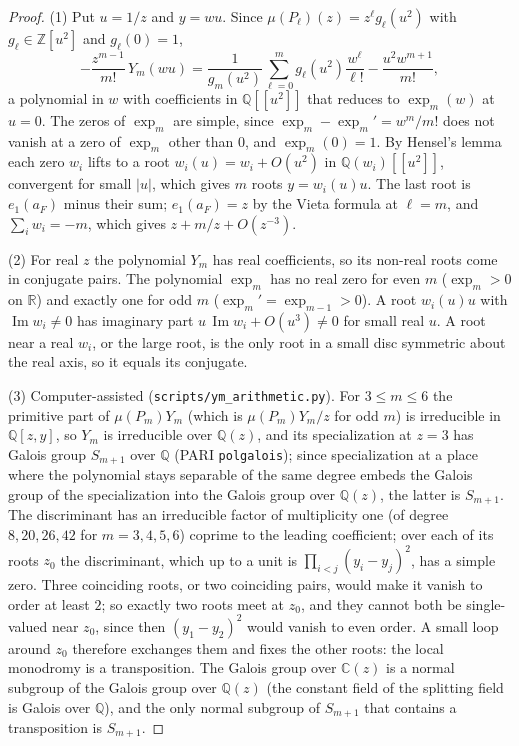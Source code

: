 \documentclass[11pt]{amsart}
\theoremstyle{plain}
\theoremstyle{definition}
\theoremstyle{remark}
\numberwithin{equation}{section}
\newcommand{\code}[1]{{\ttfamily\nolinkurl{#1}}}
\newcommand{\ZZ}{\mathbb{Z}}
\newcommand{\QQ}{\mathbb{Q}}
\newcommand{\RR}{\mathbb{R}}
\newcommand{\CC}{\mathbb{C}}
\newcommand{\Qz}{\QQ(z)}
\renewcommand{\Im}{\operatorname{Im}}
\begin{document}
\begin{proof}
(1) Put $u=1/z$ and $y=wu$. Since $\mu(P_\ell)(z)=z^{\ell}g_\ell(u^{2})$ with $g_\ell\in\ZZ[u^{2}]$ and $g_\ell(0)=1$,
\[
-\frac{z^{m-1}}{m!}\,Y_m(wu)=\frac{1}{g_m(u^{2})}\sum_{\ell=0}^{m}g_\ell(u^{2})\frac{w^{\ell}}{\ell!}-\frac{u^{2}w^{m+1}}{m!},
\]
a polynomial in $w$ with coefficients in $\QQ[[u^{2}]]$ that reduces to $\exp_m(w)$ at $u=0$. The zeros of $\exp_m$ are simple, since $\exp_m-\exp_m'=w^{m}/m!$ does not vanish at a zero of $\exp_m$ other than $0$, and $\exp_m(0)=1$. By Hensel's lemma each zero $w_i$ lifts to a root $w_i(u)=w_i+O(u^{2})$ in $\QQ(w_i)[[u^{2}]]$, convergent for small $|u|$, which gives $m$ roots $y=w_i(u)u$. The last root is $e_1(a_F)$ minus their sum; $e_1(a_F)=z$ by the Vieta formula at $\ell=m$, and $\sum_iw_i=-m$, which gives $z+m/z+O(z^{-3})$.

(2) For real $z$ the polynomial $Y_m$ has real coefficients, so its non-real roots come in conjugate pairs. The polynomial $\exp_m$ has no real zero for even $m$ ($\exp_m>0$ on $\RR$) and exactly one for odd $m$ ($\exp_m'=\exp_{m-1}>0$). A root $w_i(u)u$ with $\Im w_i\neq0$ has imaginary part $u\,\Im w_i+O(u^{3})\neq0$ for small real $u$. A root near a real $w_i$, or the large root, is the only root in a small disc symmetric about the real axis, so it equals its conjugate.

(3) Computer-assisted (\code{scripts/ym_arithmetic.py}). For $3\le m\le6$ the primitive part of $\mu(P_m)Y_m$ (which is $\mu(P_m)Y_m/z$ for odd $m$) is irreducible in $\QQ[z,y]$, so $Y_m$ is irreducible over $\Qz$, and its specialization at $z=3$ has Galois group $S_{m+1}$ over $\QQ$ (PARI \code{polgalois}); since specialization at a place where the polynomial stays separable of the same degree embeds the Galois group of the specialization into the Galois group over $\Qz$, the latter is $S_{m+1}$. The discriminant has an irreducible factor of multiplicity one (of degree $8,20,26,42$ for $m=3,4,5,6$) coprime to the leading coefficient; over each of its roots $z_0$ the discriminant, which up to a unit is $\prod_{i<j}(y_i-y_j)^2$, has a simple zero. Three coinciding roots, or two coinciding pairs, would make it vanish to order at least $2$; so exactly two roots meet at $z_0$, and they cannot both be single-valued near $z_0$, since then $(y_1-y_2)^2$ would vanish to even order. A small loop around $z_0$ therefore exchanges them and fixes the other roots: the local monodromy is a transposition. The Galois group over $\CC(z)$ is a normal subgroup of the Galois group over $\Qz$ (the constant field of the splitting field is Galois over $\QQ$), and the only normal subgroup of $S_{m+1}$ that contains a transposition is $S_{m+1}$.
\end{proof}
\end{document}
